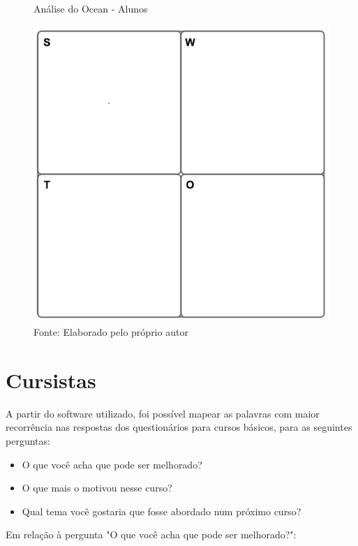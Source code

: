 \begin{figure}[H]
\caption{Análise do Ocean - Alunos}
\centerline{\includegraphics[scale=0.75]{img/generalswot}}
\label{fig:swotalunos}
\caption* {Fonte: Elaborado pelo próprio autor}
\end{figure}

\section{Cursistas}

A partir do software utilizado, foi possível mapear as palavras com maior recorrência nas respostas dos questionários para cursos básicos, para as seguintes perguntas:

\begin{itemize}
\item O que você acha que pode ser melhorado?
\item O que mais o motivou nesse curso?
\item Qual tema você gostaria que fosse abordado num próximo curso?
\end{itemize}

Em relação à pergunta "O que você acha que pode ser melhorado?":

